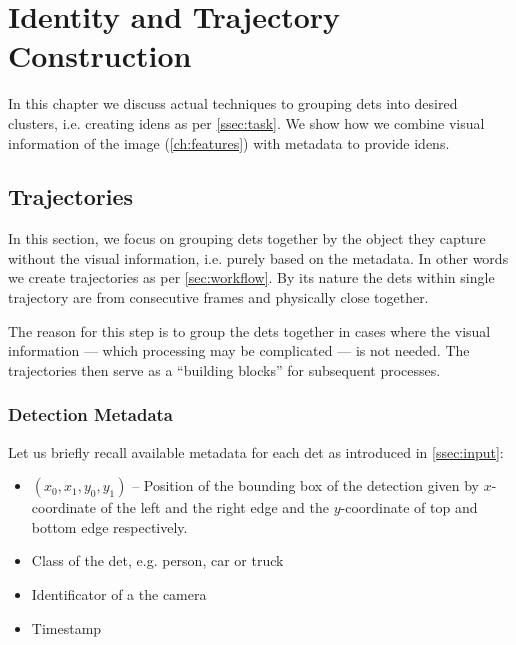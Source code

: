 \chapter{Identity and Trajectory Construction}


In this chapter we discuss actual techniques to grouping \glspl{det} into
desired clusters, i.e. creating \glspl{iden} as per \autoref{ssec:task}.
We show how we combine visual information of the image
(\autoref{ch:features}) with metadata to provide \glspl{iden}.

\section{Trajectories}

In this section, we focus on grouping \glspl{det} together by the object they
capture without the visual information, i.e. purely based on the metadata. In
other words we create trajectories as per \autoref{sec:workflow}. By its nature
the \glspl{det} within single trajectory are from consecutive frames and
physically close together.

The reason for this step is to group the \glspl{det} together in cases
where the visual information --- which processing may be complicated --- is not
needed. The trajectories then serve as a ``building blocks'' for subsequent
processes.



\subsection{Detection Metadata}

Let us briefly recall available metadata for each \gls{det} as introduced in
\autoref{ssec:input}:

\begin{itemize}
    \item $(x_0, x_1, y_0, y_1)$ -- Position of the bounding box of the detection given by $x$-coordinate of the left and the right edge and the $y$-coordinate of top and bottom edge respectively.
    \item Class of the \gls{det}, e.g. person, car or truck
    \item Identificator of a the camera
    \item Timestamp
\end{itemize}

